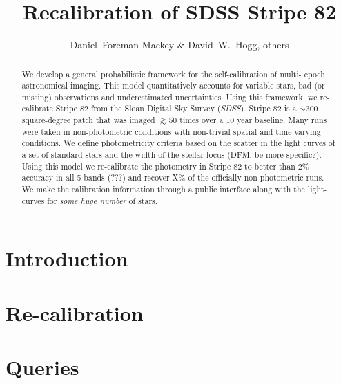 \documentclass[12pt,preprint]{aastex}
\newcommand{\project}[1]{\textsl{#1}}
\newcommand{\SDSS}{\project{SDSS}}
\begin{document}
\title{Recalibration of SDSS Stripe 82}
\author{Daniel~Foreman-Mackey \&
        David~W.~Hogg, others}

\begin{abstract}

We develop a general probabilistic framework for the self-calibration of multi-
epoch astronomical imaging.  This model quantitatively accounts for variable stars,
bad (or missing) observations and underestimated uncertainties.  Using this framework,
we re-calibrate Stripe 82 from the Sloan Digital Sky Survey (\SDSS).  Stripe 82 is
a $\sim 300$ square-degree patch that was imaged $\gtrsim 50$ times over a 10 year
baseline.  Many runs were taken in non-photometric conditions with non-trivial
spatial and time varying conditions.  We define photometricity criteria based on
the scatter in the light curves of a set of standard stars and the width of the
stellar locus (DFM: be more specific?).  Using this model we re-calibrate the
photometry in Stripe 82 to better than $2\%$ accuracy in all 5 bands (???) and
recover X\% of the officially non-photometric runs.
We make the calibration information through a public interface along with the
light-curves for {\em some huge number} of stars.

\end{abstract}

\keywords{
}

\section{Introduction}

\section{Re-calibration}

\section{Queries}




\end{document}
